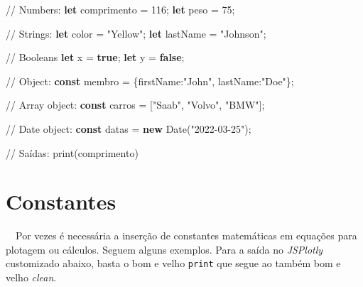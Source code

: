 \documentclass[
  portuguese,
  letterpaper,
  DIV=11,
  numbers=noendperiod]{scrreprt}
\newenvironment{Shaded}{\begin{snugshade}}{\end{snugshade}}
\newcommand{\BuiltInTok}[1]{\textcolor[rgb]{0.00,0.23,0.31}{#1}}
\newcommand{\CommentTok}[1]{\textcolor[rgb]{0.37,0.37,0.37}{#1}}
\newcommand{\DataTypeTok}[1]{\textcolor[rgb]{0.68,0.00,0.00}{#1}}
\newcommand{\DecValTok}[1]{\textcolor[rgb]{0.68,0.00,0.00}{#1}}
\newcommand{\FunctionTok}[1]{\textcolor[rgb]{0.28,0.35,0.67}{#1}}
\newcommand{\KeywordTok}[1]{\textcolor[rgb]{0.00,0.23,0.31}{\textbf{#1}}}
\newcommand{\NormalTok}[1]{\textcolor[rgb]{0.00,0.23,0.31}{#1}}
\newcommand{\OperatorTok}[1]{\textcolor[rgb]{0.37,0.37,0.37}{#1}}
\newcommand{\StringTok}[1]{\textcolor[rgb]{0.13,0.47,0.30}{#1}}
\begin{document}
\begin{Shaded}
\begin{Highlighting}[]
\CommentTok{// Numbers:}
\KeywordTok{let}\NormalTok{ comprimento }\OperatorTok{=} \DecValTok{116}\OperatorTok{;}
\KeywordTok{let}\NormalTok{ peso }\OperatorTok{=} \DecValTok{75}\OperatorTok{;}

\CommentTok{// Strings:}
\KeywordTok{let}\NormalTok{ color }\OperatorTok{=} \StringTok{"Yellow"}\OperatorTok{;}
\KeywordTok{let}\NormalTok{ lastName }\OperatorTok{=} \StringTok{"Johnson"}\OperatorTok{;}

\CommentTok{// Booleans}
\KeywordTok{let}\NormalTok{ x }\OperatorTok{=} \KeywordTok{true}\OperatorTok{;}
\KeywordTok{let}\NormalTok{ y }\OperatorTok{=} \KeywordTok{false}\OperatorTok{;}

\CommentTok{// Object:}
\KeywordTok{const}\NormalTok{ membro }\OperatorTok{=}\NormalTok{ \{}\DataTypeTok{firstName}\OperatorTok{:}\StringTok{"John"}\OperatorTok{,} \DataTypeTok{lastName}\OperatorTok{:}\StringTok{"Doe"}\NormalTok{\}}\OperatorTok{;}

\CommentTok{// Array object:}
\KeywordTok{const}\NormalTok{ carros }\OperatorTok{=}\NormalTok{ [}\StringTok{"Saab"}\OperatorTok{,} \StringTok{"Volvo"}\OperatorTok{,} \StringTok{"BMW"}\NormalTok{]}\OperatorTok{;}

\CommentTok{// Date object:}
    \KeywordTok{const}\NormalTok{ datas }\OperatorTok{=} \KeywordTok{new} \BuiltInTok{Date}\NormalTok{(}\StringTok{"2022{-}03{-}25"}\NormalTok{)}\OperatorTok{;}

\CommentTok{// Saídas:}
\FunctionTok{print}\NormalTok{(comprimento)}
\end{Highlighting}
\end{Shaded}

\section{Constantes}\label{constantes}

~~Por vezes é necessária a inserção de constantes matemáticas em
equações para plotagem ou cálculos. Seguem alguns exemplos. Para a saída
no \emph{JSPlotly} customizado abaixo, basta o bom e velho
\texttt{print} que segue ao também bom e velho \emph{clean}.
\end{document}
